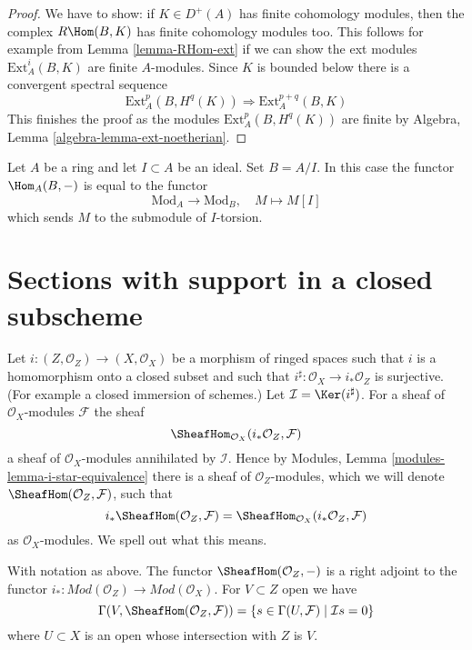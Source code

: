 \begin{proof}
We have to show: if $K \in D^+(A)$ has finite cohomology modules, then the
complex $R\Hom(B, K)$ has finite cohomology modules too.
This follows for example from Lemma \ref{lemma-RHom-ext}
if we can show the ext modules $\text{Ext}^i_A(B, K)$
are finite $A$-modules. Since $K$ is bounded below there is a
convergent spectral sequence
$$
\text{Ext}^p_A(B, H^q(K)) \Rightarrow \text{Ext}^{p + q}_A(B, K)
$$
This finishes the proof as the modules $\text{Ext}^p_A(B, H^q(K))$
are finite by
Algebra, Lemma \ref{algebra-lemma-ext-noetherian}.
\end{proof}

\begin{remark}
\label{remark-exact-support}
Let $A$ be a ring and let $I \subset A$ be an ideal. Set $B = A/I$.
In this case the functor $\Hom_A(B, -)$ is equal to the functor
$$
\text{Mod}_A \longrightarrow \text{Mod}_B,\quad M \longmapsto M[I]
$$
which sends $M$ to the submodule of $I$-torsion.
\end{remark}





\section{Sections with support in a closed subscheme}
\label{section-sections-with-exact-support}

\noindent
Let $i : (Z, \mathcal{O}_Z) \to (X, \mathcal{O}_X)$ be a morphism
of ringed spaces such that $i$ is a homomorphism onto a closed
subset and such that $i^\sharp : \mathcal{O}_X \to i_*\mathcal{O}_Z$
is surjective. (For example a closed immersion of schemes.)
Let $\mathcal{I} = \Ker(i^\sharp)$. For a sheaf
of $\mathcal{O}_X$-modules $\mathcal{F}$ the sheaf
$$
\SheafHom_{\mathcal{O}_X}(i_*\mathcal{O}_Z, \mathcal{F})
$$
a sheaf of $\mathcal{O}_X$-modules annihilated by $\mathcal{I}$.
Hence by Modules, Lemma \ref{modules-lemma-i-star-equivalence}
there is a sheaf of $\mathcal{O}_Z$-modules,
which we will denote $\SheafHom(\mathcal{O}_Z, \mathcal{F})$,
such that
$$
i_*\SheafHom(\mathcal{O}_Z, \mathcal{F}) =
\SheafHom_{\mathcal{O}_X}(i_*\mathcal{O}_Z, \mathcal{F})
$$
as $\mathcal{O}_X$-modules. We spell out what this means.

\begin{lemma}
\label{lemma-compute-sheaf-with-exact-support}
With notation as above. The functor $\SheafHom(\mathcal{O}_Z, -)$ is a
right adjoint to the functor
$i_* : \textit{Mod}(\mathcal{O}_Z) \to \textit{Mod}(\mathcal{O}_X)$.
For $V \subset Z$ open we have
$$
\Gamma(V, \SheafHom(\mathcal{O}_Z, \mathcal{F})) =
\{s \in \Gamma(U, \mathcal{F}) \mid \mathcal{I}s = 0\}
$$
where $U \subset X$ is an open whose intersection with $Z$ is $V$.
\end{lemma}

